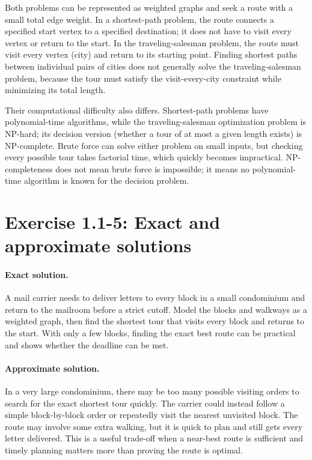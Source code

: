 Both problems can be represented as weighted graphs and seek a route with a
small total edge weight. In a shortest-path problem, the route connects a
specified start vertex to a specified destination; it does not have to visit
every vertex or return to the start. In the traveling-salesman problem, the
route must visit every vertex (city) and return to its starting point. Finding
shortest paths between individual pairs of cities does not generally solve the
traveling-salesman problem, because the tour must satisfy the visit-every-city
constraint while minimizing its total length.

Their computational difficulty also differs. Shortest-path problems have
polynomial-time algorithms, while the traveling-salesman optimization problem
is NP-hard; its decision version (whether a tour of at most a given length
exists) is NP-complete. Brute force can solve either problem on small inputs,
but checking every possible tour takes factorial time, which quickly becomes
impractical. NP-completeness does not mean brute force is impossible; it means
no polynomial-time algorithm is known for the decision problem.

\section{Exercise 1.1-5: Exact and approximate solutions}

\paragraph{Exact solution.}
A mail carrier needs to deliver letters to every block in a small condominium
and return to the mailroom before a strict cutoff. Model the blocks and walkways
as a weighted graph, then find the shortest tour that visits every block and
returns to the start. With only a few blocks, finding the exact best route can
be practical and shows whether the deadline can be met.

\paragraph{Approximate solution.}
In a very large condominium, there may be too many possible visiting orders to
search for the exact shortest tour quickly. The carrier could instead follow a
simple block-by-block order or repeatedly visit the nearest unvisited block.
The route may involve some extra walking, but it is quick to plan and still gets
every letter delivered. This is a useful trade-off when a near-best route is
sufficient and timely planning matters more than proving the route is optimal.

